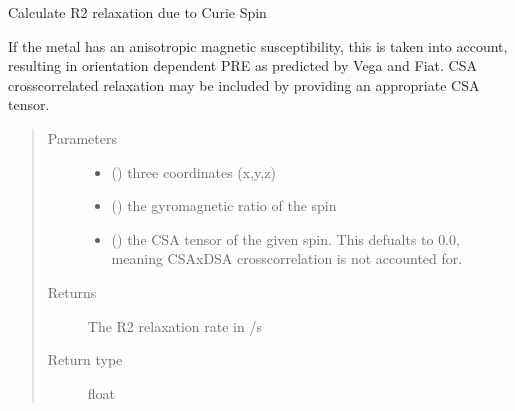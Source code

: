 \documentclass[a4paper,10pt,english,openany,oneside]{sphinxmanual}
\begin{document}
\begin{fulllineitems}
\begin{fulllineitems}
\begin{fulllineitems}
\label{\detokenize{reference/generated/paramagpy.metal.Metal.dsa_r2:paramagpy.metal.Metal.dsa_r2}}
\sphinxAtStartPar
Calculate R2 relaxation due to Curie Spin

\sphinxAtStartPar
If the metal has an anisotropic magnetic susceptibility, this is
taken into account, resulting in orientation dependent PRE as
predicted by Vega and Fiat. CSA cross\sphinxhyphen{}correlated relaxation may
be included by providing an appropriate CSA tensor.
\begin{quote}\begin{description}
\item[{Parameters}] \leavevmode\begin{itemize}
\item {} 
\sphinxAtStartPar
{} () \textendash{} three coordinates (x,y,z)

\item {} 
\sphinxAtStartPar
{} () \textendash{} the gyromagnetic ratio of the spin

\item {} 
\sphinxAtStartPar
{} (\sphinxstyleliteralemphasis{\sphinxupquote{ (}}\sphinxstyleliteralemphasis{\sphinxupquote{)}}) \textendash{} the CSA tensor of the given spin.
This defualts to 0.0, meaning CSAxDSA crosscorrelation is
not accounted for.

\end{itemize}

\item[{Returns}] \leavevmode
\sphinxAtStartPar
{} \textendash{} The R2 relaxation rate in /s

\item[{Return type}] \leavevmode
\sphinxAtStartPar
float

\end{description}\end{quote}

\end{fulllineitems}




\end{fulllineitems}
\end{fulllineitems}
\end{document}
